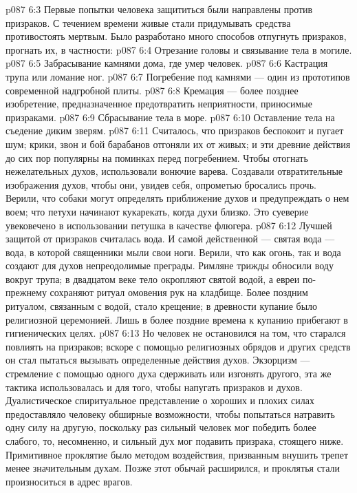 \vs p087 6:3 Первые попытки человека защититься были направлены против призраков. С течением времени живые стали придумывать средства противостоять мертвым. Было разработано много способов отпугнуть призраков, прогнать их, в частности:
\vs p087 6:4 \bibnobreakspace Отрезание головы и связывание тела в могиле.
\vs p087 6:5 \bibnobreakspace Забрасывание камнями дома, где умер человек.
\vs p087 6:6 \bibnobreakspace Кастрация трупа или ломание ног.
\vs p087 6:7 \bibnobreakspace Погребение под камнями --- один из прототипов современной надгробной плиты.
\vs p087 6:8 \bibnobreakspace Кремация --- более позднее изобретение, предназначенное предотвратить неприятности, приносимые призраками.
\vs p087 6:9 \bibnobreakspace Сбрасывание тела в море.
\vs p087 6:10 \bibnobreakspace Оставление тела на съедение диким зверям.
\vs p087 6:11 \pc Считалось, что призраков беспокоит и пугает шум; крики, звон и бой барабанов отгоняли их от живых; и эти древние действия до сих пор популярны на поминках перед погребением. Чтобы отогнать нежелательных духов, использовали вонючие варева. Создавали отвратительные изображения духов, чтобы они, увидев себя, опрометью бросались прочь. Верили, что собаки могут определять приближение духов и предупреждать о нем воем; что петухи начинают кукарекать, когда духи близко. Это суеверие увековечено в использовании петушка в качестве флюгера.
\vs p087 6:12 Лучшей защитой от призраков считалась вода. И самой действенной --- святая вода --- вода, в которой священники мыли свои ноги. Верили, что как огонь, так и вода создают для духов непреодолимые преграды. Римляне трижды обносили воду вокруг трупа; в двадцатом веке тело окропляют святой водой, а евреи по\hyp{}прежнему сохраняют ритуал омовения рук на кладбище. Более поздним ритуалом, связанным с водой, стало крещение; в древности купание было религиозной церемонией. Лишь в более поздние времена к купанию прибегают в гигиенических целях.
\vs p087 6:13 Но человек не остановился на том, что старался повлиять на призраков; вскоре с помощью религиозных обрядов и других средств он стал пытаться вызывать определенные действия духов. Экзорцизм --- стремление с помощью одного духа сдерживать или изгонять другого, эта же тактика использовалась и для того, чтобы напугать призраков и духов. Дуалистическое спиритуальное представление о хороших и плохих силах предоставляло человеку обширные возможности, чтобы попытаться натравить одну силу на другую, поскольку раз сильный человек мог победить более слабого, то, несомненно, и сильный дух мог подавить призрака, стоящего ниже. Примитивное проклятие было методом воздействия, призванным внушить трепет менее значительным духам. Позже этот обычай расширился, и проклятья стали произноситься в адрес врагов.
